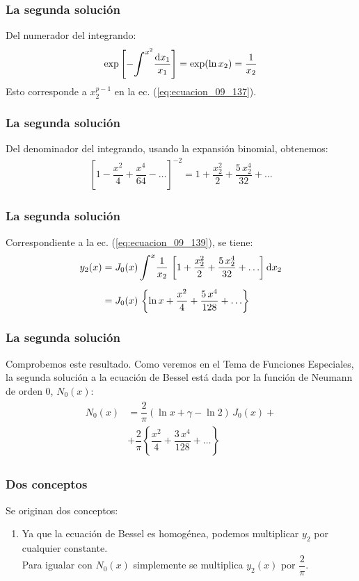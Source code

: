 \documentclass[12pt]{beamer}
\begin{document}
\begin{frame}
\frametitle{La segunda solución}
Del numerador del integrando:
\pause
\begin{align*}
\exp \left[ - \scaleint{6ex}^{x^{2}} \dfrac{\dd{x_{1}}}{x_{1}} \right]= \exp (\ln x_{2}) = \dfrac{1}{x_{2}} 
\end{align*}
Esto corresponde a $x_{2}^{p-1}$ en la ec. (\ref{eq:ecuacion_09_137}).
\end{frame}
\begin{frame}
\frametitle{La segunda solución}
Del denominador del integrando, usando la expansión binomial, obtenemos:
\pause
\begin{align*}
\left[ 1 - \dfrac{x^{2}}{4} + \dfrac{x^{4}}{64} - \ldots \right]^{-2} = 1 + \dfrac{x_{2}^{2}}{2} + \dfrac{5 \, x_{2}^{4}}{32} + \ldots
\end{align*}
\end{frame}
\begin{frame}
\frametitle{La segunda solución}
Correspondiente a la ec. (\ref{eq:ecuacion_09_139}), se tiene:
\pause
\begin{align}
y_{2} (x) &= J_{0} (x) \, \scaleint{6ex}^{x} \dfrac{1}{x_{2}} \, \left[ 1 + \dfrac{x_{2}^{2}}{2} + \dfrac{5 \, x_{2}^{4}}{32} + \ldots \right] \dd{x_{2}} \nonumber \\[0.5em]
&= J_{0} (x) \, \left\{ \ln x + \dfrac{x^{2}}{4} + \dfrac{5 \, x^{4}}{128} + \ldots  \right\}
\label{eq:ecuacion_09_142c}
\end{align}
\end{frame}
\begin{frame}
\frametitle{La segunda solución}
Comprobemos este resultado. Como veremos en el Tema de Funciones Especiales, la segunda solución a la ecuación de Bessel está dada por la función de Neumann de orden $0$, $N_{0} (x)$:
\pause
\begin{align}
\begin{aligned}
N_{0} (x) &= \dfrac{2}{\pi} (\ln x + \gamma - \ln 2) \,J_{0} (x) + \\
&+ \dfrac{2}{\pi} \left\{ \dfrac{x^{2}}{4} + \dfrac{3 \, x^{4}}{128} + \ldots \right\}
\end{aligned}
\label{eq:ecuacion_09_142d}
\end{align}
\end{frame}
\begin{frame}
\frametitle{Dos conceptos}
Se originan dos conceptos:
\begin{enumerate}[<+->]
\item Ya que la ecuación de Bessel es homogénea, podemos multiplicar $y_{2}$ por cualquier constante. 
\\
\bigskip
Para igualar con $N_{0} (x)$ simplemente se multiplica $y_{2} (x)$ por $\dfrac{2}{\pi}$.
\seti
\end{enumerate}
\end{frame}
\end{document}
